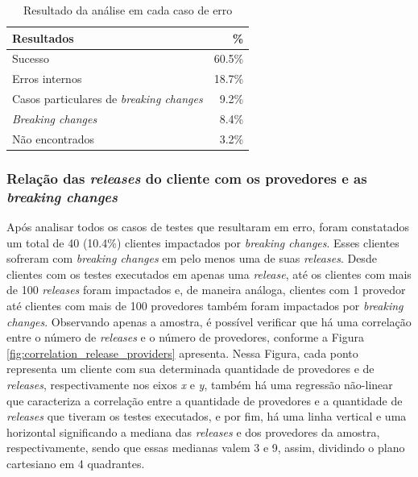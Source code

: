 \begin{table}[]
\centering
\begin{tabular}{lr}
\toprule
\textbf{Resultados}                & \textbf{\%} \\ \hline
Sucesso                                & 60.5\%      \\
Erros internos                         & 18.7\%      \\
Casos particulares de \textit{breaking changes} & 9.2\%       \\
\textit{Breaking changes}              & 8.4\%       \\
Não encontrados                        & 3.2\%       \\ \bottomrule
\end{tabular}\caption{Resultado da análise em cada caso de erro}
\label{tab:pre_res_rq1}
\end{table}

\subsubsection{Relação das \textit{releases} do cliente com os provedores e as \textit{breaking changes}}

Após analisar todos os casos de testes que resultaram em erro, foram constatados um total de 40 (10.4\%) clientes impactados por \textit{breaking changes}. Esses clientes sofreram com \textit{breaking changes} em pelo menos uma de suas \textit{releases}. Desde clientes com os testes executados em apenas uma \textit{release}, até os clientes com mais de 100 \textit{releases} foram impactados e, de maneira análoga, clientes com 1 provedor até clientes com mais de 100 provedores também foram impactados por \textit{breaking changes}. Observando apenas a amostra, é possível verificar que há uma correlação entre o número de \textit{releases} e o número de provedores, conforme a Figura \ref{fig:correlation_release_providers} apresenta. Nessa Figura, cada ponto representa um cliente com sua determinada quantidade de provedores e de \textit{releases}, respectivamente nos eixos \textit{x} e \textit{y}, também há uma regressão não-linear que caracteriza a correlação entre a quantidade de provedores e a quantidade de \textit{releases} que tiveram os testes executados, e por fim, há uma linha vertical e uma horizontal significando a mediana das \textit{releases} e dos provedores da amostra, respectivamente, sendo que essas medianas valem 3 e 9, assim, dividindo o plano cartesiano em 4 quadrantes. 

